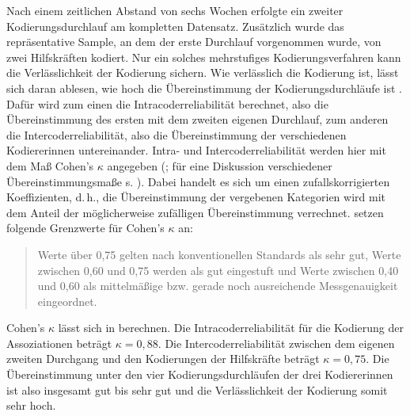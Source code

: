 Nach einem zeitlichen Abstand von sechs Wochen erfolgte ein zweiter Kodierungsdurchlauf am kompletten Datensatz. 
Zusätzlich wurde das repräsentative Sample, an dem der erste Durchlauf vorgenommen wurde, von zwei Hilfskräften kodiert. 
Nur ein solches mehrstufiges Kodierungsverfahren kann die Verlässlichkeit der Kodierung sichern. 
Wie verlässlich die Kodierung ist, lässt sich daran ablesen, wie hoch die Übereinstimmung der Kodierungsdurchläufe ist \citep[s.][557]{Artstein.2008}. 
Dafür wird zum einen die Intracoderreliabilität berechnet, also die Übereinstimmung des ersten mit dem zweiten eigenen Durchlauf, zum anderen die Intercoderreliabilität, also die Übereinstimmung der verschiedenen Kodiererinnen untereinander. 
Intra- und Intercoderreliabilität werden hier mit dem Maß Cohen's $\kappa$ angegeben (\citealp[s.][]{Cohen.1960}; für eine Diskussion verschiedener Übereinstimmungsmaße s. \citealp{Artstein.2008}).
Dabei handelt es sich um einen zufallskorrigierten Koeffizienten, d.\,h., die Übereinstimmung der vergebenen Kategorien wird mit dem Anteil der möglicherweise zufälligen Übereinstimmung verrechnet. 
\citet{Doring2016} setzen folgende Grenzwerte für Cohen's $\kappa$ an: \begin{quote} Werte über 0,75 gelten nach konventionellen Standards als sehr gut, Werte zwischen 0,60 und 0,75 werden als gut eingestuft und Werte zwischen 0,40 und 0,60 als mittelmäßige bzw. gerade noch ausreichende Messgenauigkeit eingeordnet. \citep[346]{Doring2016} \end{quote}
Cohen's $\kappa$ lässt sich in \citeauthor{MAXQDA.19892018} berechnen. 
Die Intracoderreliabilität für die Kodierung der Assoziationen beträgt $\kappa=0{,}88$.
Die Intercoderreliabilität zwischen dem eigenen zweiten Durchgang und den Kodierungen der Hilfskräfte beträgt $\kappa=0{,}75$.
Die Übereinstimmung unter den vier Kodierungsdurchläufen der drei Kodiererinnen ist also insgesamt gut bis sehr gut und die Verlässlichkeit der Kodierung somit sehr hoch. 
